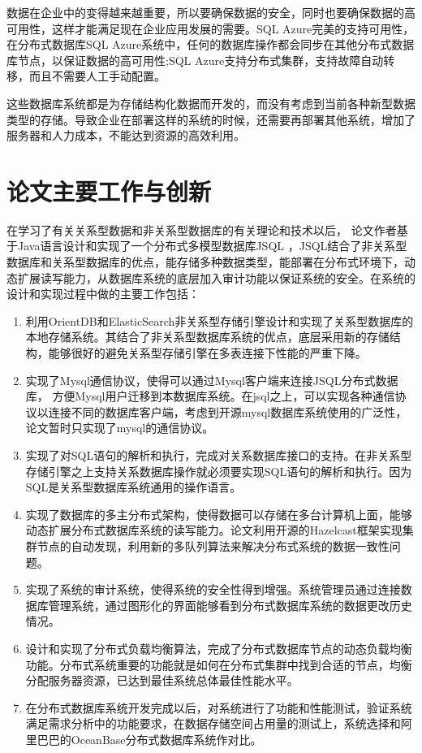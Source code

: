 	数据在企业中的变得越来越重要，所以要确保数据的安全，同时也要确保数据的高可用性，这样才能满足现在企业应用发展的需要。SQL Azure完美的支持可用性，在分布式数据库SQL Azure系统中，任何的数据库操作都会同步在其他分布式数据库节点，以保证数据的高可用性;SQL Azure支持分布式集群，支持故障自动转移，而且不需要人工手动配置。
	
	这些数据库系统都是为存储结构化数据而开发的，而没有考虑到当前各种新型数据类型的存储。导致企业在部署这样的系统的时候，还需要再部署其他系统，增加了服务器和人力成本，不能达到资源的高效利用。
\section{论文主要工作与创新}
在学习了有关关系型数据和非关系型数据库的有关理论和技术以后，
论文作者基于Java语言设计和实现了一个分布式多模型数据库JSQL
，JSQL结合了非关系型数据库和关系型数据库的优点，能存储多种数据类型，能部署在分布式环境下，动态扩展读写能力，从数据库系统的底层加入审计功能以保证系统的安全。在系统的设计和实现过程中做的主要工作包括：
\begin{enumerate}[fullwidth,itemindent=2em]
	\item 利用OrientDB和ElasticSearch非关系型存储引擎设计和实现了关系型数据库的本地存储系统。其结合了非关系型数据库系统的优点，底层采用新的存储结构，能够很好的避免关系型存储引擎在多表连接下性能的严重下降。
	\item 实现了Mysql通信协议，使得可以通过Mysql客户端来连接JSQL分布式数据库，
	方便Mysql用户迁移到本数据库系统。在jsql之上，可以实现各种通信协议以连接不同的数据库客户端，考虑到开源mysql数据库系统使用的广泛性，论文暂时只实现了mysql的通信协议。
	\item 实现了对SQL语句的解析和执行，完成对关系数据库接口的支持。在非关系型存储引擎之上支持关系数据库操作就必须要实现SQL语句的解析和执行。因为SQL是关系型数据库系统通用的操作语言。
	\item 实现了数据库的多主分布式架构，使得数据可以存储在多台计算机上面，能够动态扩展分布式数据库系统的读写能力。论文利用开源的Hazelcast框架实现集群节点的自动发现，利用新的多队列算法来解决分布式系统的数据一致性问题。
	\item 实现了系统的审计系统，使得系统的安全性得到增强。系统管理员通过连接数据库管理系统，通过图形化的界面能够看到分布式数据库系统的数据更改历史情况。
	\item 设计和实现了分布式负载均衡算法，完成了分布式数据库节点的动态负载均衡功能。分布式系统重要的功能就是如何在分布式集群中找到合适的节点，均衡分配服务器资源，已达到最佳系统总体最佳性能水平。
	\item 在分布式数据库系统开发完成以后，对系统进行了功能和性能测试，验证系统满足需求分析中的功能要求，在数据存储空间占用量的测试上，系统选择和阿里巴巴的OceanBase分布式数据库系统作对比。
\end{enumerate}


